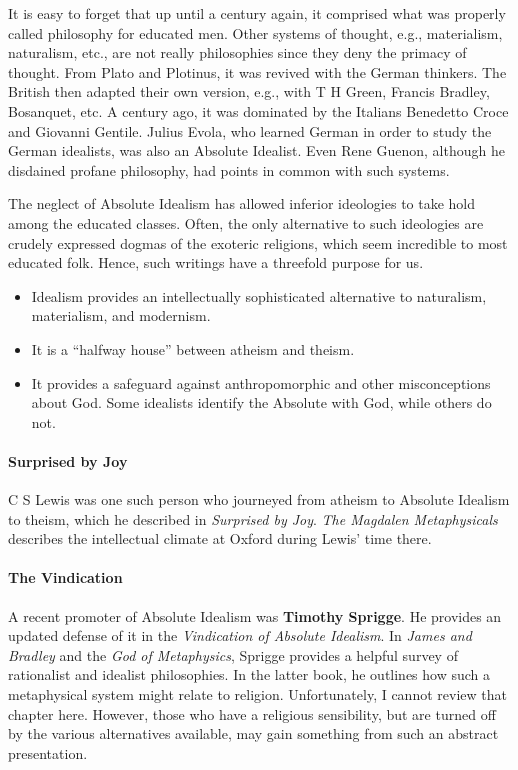 It is easy to forget that up until a century again, it comprised what was properly called philosophy for educated men.
Other systems of thought, e.g., materialism, naturalism, etc., are not really philosophies since they deny the primacy
of thought. From Plato and Plotinus, it was revived with the German thinkers. The British then adapted their own
version, e.g., with T H Green, Francis Bradley, Bosanquet, etc. A century ago, it was dominated by the Italians
Benedetto Croce and Giovanni Gentile. Julius Evola, who learned German in order to study the German idealists, was also
an Absolute Idealist. Even Rene Guenon, although he disdained profane philosophy, had points in common with such
systems.

The neglect of Absolute Idealism has allowed inferior ideologies to take hold among the educated classes. Often, the
only alternative to such ideologies are crudely expressed dogmas of the exoteric religions, which seem incredible to
most educated folk. Hence, such writings have a threefold purpose for us.

\begin{itemize}
\item Idealism provides an intellectually sophisticated alternative to naturalism, materialism, and modernism. 
\item It is a “halfway house” between atheism and theism. 
\item It provides a safeguard against anthropomorphic and other misconceptions about God. Some idealists identify the
Absolute with God, while others do not. 
\end{itemize}

\paragraph{Surprised by Joy}
C S Lewis was one such person who journeyed from atheism to Absolute Idealism to theism, which he described in
\emph{Surprised by Joy}. \emph{The Magdalen Metaphysicals} describes the intellectual climate at Oxford during
Lewis' time there.

\paragraph{The Vindication}
A recent promoter of Absolute Idealism was \textbf{Timothy Sprigge}. He provides an updated defense of it in the
\emph{Vindication of Absolute Idealism}. In \emph{James and Bradley} and the \emph{God of Metaphysics}, Sprigge
provides a helpful survey of rationalist and idealist philosophies. In the latter book, he outlines how such a
metaphysical system might relate to religion. Unfortunately, I cannot review that chapter here. However, those who have
a religious sensibility, but are turned off by the various alternatives available, may gain something from such an
abstract presentation.

